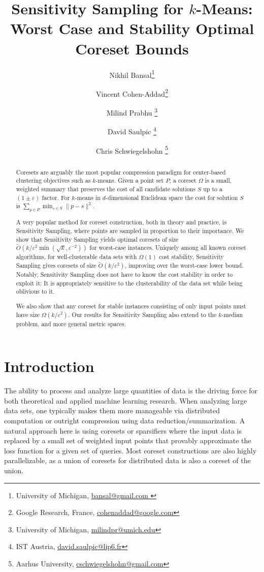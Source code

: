 \documentclass[11pt]{article}
\title{
Sensitivity Sampling for $k$-Means:\\
Worst Case and Stability Optimal Coreset Bounds
}
\author{ 
Nikhil Bansal\thanks{University of Michigan, \url{bansal@gmail.com }} \and 
Vincent Cohen-Addad\thanks{Google Research, France,  \url{cohenaddad@google.com}} \and 
Milind Prabhu \thanks{University of Michigan, \url{milindpr@umich.edu}}  \and
David Saulpic \thanks{IST Austria, \url{david.saulpic@lip6.fr}} \and
Chris Schwiegelshohn \thanks{Aarhus University, \url{cschwiegelshohn@gmail.com}}
}
\date{}
\theoremstyle{restate}
\theoremstyle{definition}
\newcommand{\Ot}{\ensuremath{\widetilde{O}}}
\begin{document}
 
 \maketitle
	
	
    \smallskip
	
	\setcounter{tocdepth}{3}
\begin{abstract}
    Coresets are arguably the most popular compression paradigm for center-based clustering objectives such as $k$-means. Given a point set $P$, a coreset $\Omega$ is a small, weighted summary that preserves the cost of all candidate solutions $S$ up to a $(1\pm \varepsilon)$ factor. For $k$-means in $d$-dimensional Euclidean space the cost for solution $S$ is $\sum_{p\in P}\min_{s\in S}\|p-s\|^2$. 
    
A very popular method for coreset construction, both in theory and practice, is Sensitivity Sampling, where
points are sampled in proportion to their importance. 
We show that Sensitivity Sampling yields optimal coresets of size $\Ot(k/\varepsilon^2\min(\sqrt{k},\varepsilon^{-2}))$ for worst-case instances. 
Uniquely among all known coreset algorithms, for well-clusterable data sets with $\Omega(1)$ cost stability, 
Sensitivity Sampling gives coresets 
of size $\Ot(k/\varepsilon^2)$, improving over the worst-case lower bound.
Notably, Sensitivity Sampling does not have to know the cost stability in order to exploit it: It is appropriately sensitive to the clusterability of the data set while being oblivious to it. 

We also show that any coreset for stable instances consisting of only input points must have size $\Omega(k/\varepsilon^2)$. Our results
for Sensitivity Sampling also extend to the $k$-median problem, and more general metric spaces. 
\end{abstract}

        \thispagestyle{empty}
        \clearpage
        \setcounter{page}{1}
        \allowdisplaybreaks
\section{Introduction}
The ability to process and analyze large quantities of data is the driving force for both theoretical and applied machine learning research.
When analyzing large data sets, one typically makes them more manageable via distributed computation or outright compression using data reduction/summarization.
A natural approach here is using coresets or sparsifiers where the input data is replaced by a small set of weighted input points that provably approximate the loss function for a given set of queries.
Most coreset constructions are also highly parallelizable, as a union of coresets for distributed data is also a coreset of the union.
\end{document}
